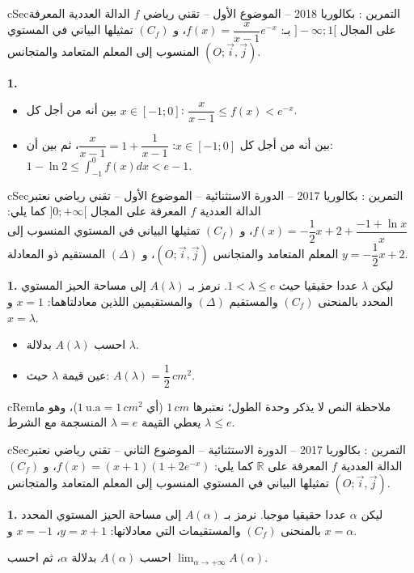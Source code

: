 \documentclass[12pt,a4paper]{article}
\newenvironment{BOX}[2]{\begin{otherlanguage}{english}\begin{arbox}{#1}{#2}}{\end{arbox}\end{otherlanguage}}
\newenvironment{molahada}[1][ملاحظة]{\begin{BOX}{cRem}{#1}}{\end{BOX}}
\newcounter{exo}
\newenvironment{tamrin}[1]{\stepcounter{exo}\begin{BOX}{cSec}{التمرين \theexo: #1}}{\end{BOX}}
\newcommand{\R}{\mathbb{R}}
\newenvironment{sq}{\begin{itemize}[leftmargin=2.4em,itemsep=3pt]}{\end{itemize}}
\newcommand{\qa}{\item[(أ)]}\newcommand{\qb}{\item[(ب)]}\newcommand{\qc}{\item[(جـ)]}\newcommand{\qd}{\item[(د)]}\newcommand{\qe}{\item[(هـ)]}
\newcommand{\QQ}[1]{\par\smallskip\textbf{#1.} }
\begin{document}
\begin{tamrin}{بكالوريا 2018 -- الموضوع الأول -- تقني رياضي}
$f$ الدالة العددية المعرفة على المجال $]-\infty;1[$ بـ: $f(x)=\dfrac{x}{x-1}e^{-x}$، و $(C_f)$ تمثيلها البياني في المستوي المنسوب إلى المعلم المتعامد والمتجانس $(O;\vec{i},\vec{j})$.

\QQ{1}
\begin{sq}
\qa بين أنه من أجل كل $x\in[-1;0]$: $\dfrac{x}{x-1}\le f(x)<e^{-x}$.
\qb بين أنه من أجل كل $x\in[-1;0]$: $\dfrac{x}{x-1}=1+\dfrac{1}{x-1}$، ثم بين أن: $1-\ln2\le\displaystyle\int_{-1}^{0}f(x)dx<e-1$.
\end{sq}
\end{tamrin}

\begin{tamrin}{بكالوريا 2017 -- الدورة الاستثنائية -- الموضوع الأول -- تقني رياضي}
نعتبر الدالة العددية $f$ المعرفة على المجال $]0;+\infty[$ كما يلي: $f(x)=-\dfrac12x+2+\dfrac{-1+\ln x}{x}$، و $(C_f)$ تمثيلها البياني في المستوي المنسوب إلى المعلم المتعامد والمتجانس $(O;\vec{i},\vec{j})$، و $(\Delta)$ المستقيم ذو المعادلة $y=-\dfrac12x+2$.

\QQ{1} ليكن $\lambda$ عددا حقيقيا حيث $1<\lambda\le e$. نرمز بـ $A(\lambda)$ إلى مساحة الحيز المستوي المحدد بالمنحنى $(C_f)$ والمستقيم $(\Delta)$ والمستقيمين اللذين معادلتاهما: $x=1$ و $x=\lambda$.
\begin{sq}
\qa احسب $A(\lambda)$ بدلالة $\lambda$.
\qb عين قيمة $\lambda$ حيث: $A(\lambda)=\dfrac12\,cm^{2}$.
\end{sq}
\end{tamrin}

\begin{molahada}
النص لا يذكر وحدة الطول؛ نعتبرها $1\,cm$ (أي $1\ \text{u.a}=1\,cm^{2}$)، وهو ما يعطي القيمة $\lambda=e$ المنسجمة مع الشرط $\lambda\le e$.
\end{molahada}

\begin{tamrin}{بكالوريا 2017 -- الدورة الاستثنائية -- الموضوع الثاني -- تقني رياضي}
نعتبر الدالة العددية $f$ المعرفة على $\R$ كما يلي: $f(x)=(x+1)\left(1+2e^{-x}\right)$، و $(C_f)$ تمثيلها البياني في المستوي المنسوب إلى المعلم المتعامد والمتجانس $(O;\vec{i},\vec{j})$.

\QQ{1} ليكن $\alpha$ عددا حقيقيا موجبا. نرمز بـ $A(\alpha)$ إلى مساحة الحيز المستوي المحدد بالمنحنى $(C_f)$ والمستقيمات التي معادلاتها: $y=x+1$، $x=-1$ و $x=\alpha$.

احسب $A(\alpha)$ بدلالة $\alpha$، ثم احسب $\displaystyle\lim_{\alpha\to+\infty}A(\alpha)$.
\end{tamrin}
\end{document}
